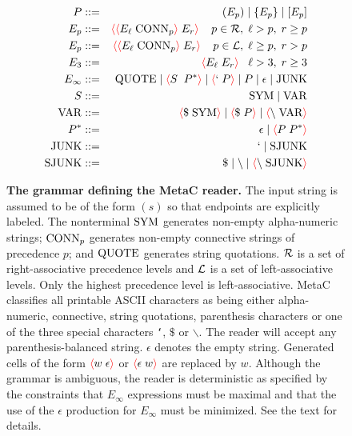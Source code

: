 \documentclass{article}
\newcommand{\fopen}{{\color{red} \langle}}
\newcommand{\fclose}{{\color{red} \rangle}}
\begin{document}
\begin{figure}
  
\begin{eqnarray*}
  P & ::= & (E_p) \;|\; \{E_p\} \;|\; [E_p] \\
  E_p & ::= & \fopen \fopen E_\ell\;\conn_p\fclose \;E_r\fclose\;\;\;\;p \in {\cal R}, \;\ell > p, \; r \geq p \\
  E_p & ::= & \fopen \fopen E_\ell\;\conn_p\fclose \;E_r\fclose\;\;\;\;p \in {\cal L}, \; \ell \geq p,\; r > p \\
  E_3 & ::= & \fopen E_\ell \;E_r\fclose \;\;\;\ell > 3,\;r \geq 3\\
  E_\infty & ::= & \quot \;|\; \fopen S \; \;P^* \fclose \;|\; \fopen `\;P\fclose \;|\; P \;|\; \epsilon \;|\; \mathrm{JUNK}\\
  S & ::= & \;\sym \;|\; \var \\
  \var & ::= & \fopen \$\;\sym\fclose \;|\; \fopen \$\;P\fclose \;|\; \fopen \backslash \; \var \fclose\\
  P^* & ::= &  \epsilon  \;|\; \fopen P\;P^* \fclose \\
  \mathrm{JUNK} & ::= & ` \;|\; \mathrm{SJUNK} \\
  \mathrm{SJUNK} & :: = & \$ \;|\;  \backslash \;|\; \fopen \backslash\;\mathrm{SJUNK} \fclose\\
\end{eqnarray*}

\caption{{\bf The grammar defining the MetaC reader.} The input string is assumed to be of the form $(s)$ so that endpoints are explicitly labeled.
The nonterminal $\mathrm{SYM}$ generates non-empty alpha-numeric strings; $\mathrm{CONN}_p$ generates non-empty connective
strings of precedence $p$; and $\mathrm{QUOTE}$ generates string quotations.  ${\cal R}$ is a set of right-associative precedence levels and ${\cal L}$ is a set of left-associative levels.
Only the highest precedence level is left-associative. MetaC classifies all printable ASCII characters as being either alpha-numeric, connective, string quotations, parenthesis characters or one of the three special characters
{\tt `}, $\$$ or $\backslash$.
The reader will accept any parenthesis-balanced string. $\epsilon$ denotes the empty string. Generated cells of the form $\fopen w\;\epsilon \fclose$ or $\fopen \epsilon \;w\fclose$ are replaced by $w$.
Although the grammar is ambiguous, the reader is deterministic as specified by the constraints that
$E_\infty$ expressions must be maximal and that the use of the $\epsilon$ production for $E_\infty$ must be minimized.  See the text for details.
  }
\label{fig:grammar}
\end{figure}
\end{document}
